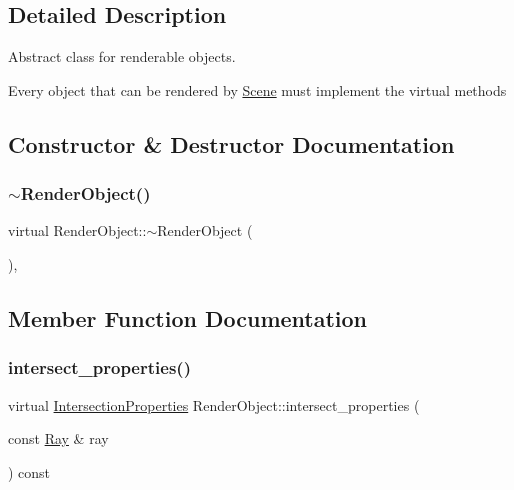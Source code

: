 \subsection{Detailed Description}
Abstract class for renderable objects. 

Every object that can be rendered by \mbox{\hyperlink{classScene}{Scene}} must implement the virtual methods 

\subsection{Constructor \& Destructor Documentation}
\mbox{\label{classRenderObject_ac4b49b10f81b6bd12d9a25f4d929d9d8}} 
\subsubsection{\texorpdfstring{$\sim$RenderObject()}{~RenderObject()}}
{\footnotesize\ttfamily virtual Render\+Object\+::$\sim$\+Render\+Object (\begin{DoxyParamCaption}{ }\end{DoxyParamCaption})\hspace{0.3cm}{\ttfamily [inline]}, {\ttfamily [virtual]}}



\subsection{Member Function Documentation}
\mbox{\label{classRenderObject_a792d36570e3264530872187ca1b0baca}} 
\subsubsection{\texorpdfstring{intersect\_properties()}{intersect\_properties()}}
{\footnotesize\ttfamily virtual \mbox{\hyperlink{classIntersectionProperties}{Intersection\+Properties}} Render\+Object\+::intersect\+\_\+properties (\begin{DoxyParamCaption}\item[{const \mbox{\hyperlink{classRay}{Ray}} \&}]{ray }\end{DoxyParamCaption}) const\hspace{0.3cm}{\ttfamily [pure virtual]}}



